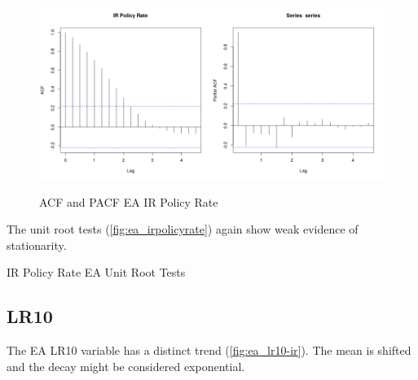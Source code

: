 \documentclass[10pt]{article}
\begin{document}
\begin{figure}[h!]
\centering
\includegraphics[width = 0.5\textwidth]{"../acf/ea_IR Policy Rate"}\includegraphics[width = 0.5\textwidth]{"../pacf/ea_IR Policy Rate"}
\caption{ACF and PACF EA IR Policy Rate}
\label{fig:ea_irpolicyrate_acf}
\end{figure}

The unit root tests (\autoref{fig:ea_irpolicyrate}) again show weak evidence of stationarity.

\begin{table}[h!]
\centering
{}
\caption{IR Policy Rate EA Unit Root Tests}
\label{table:ea_irpolicyrate}
\end{table}



\subsection{LR10}

The EA LR10 variable has a distinct trend (\autoref{fig:ea_lr10-ir}). The mean is shifted and the decay might be considered exponential.
\end{document}
